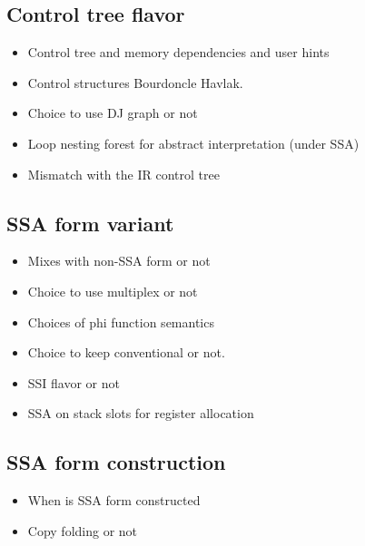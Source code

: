 \subsection{Control tree flavor}

\begin{itemize}

\item Control tree and memory dependencies and user hints

\item Control structures Bourdoncle Havlak.

\item Choice to use DJ graph or not

\item Loop nesting forest for abstract interpretation (under SSA)

\item Mismatch with the IR control tree

\end{itemize}

\subsection{SSA form variant}

\begin{itemize}

\item Mixes with non-SSA form or not

\item Choice to use multiplex or not

\item Choices of phi function semantics

\item Choice to keep conventional or not.

\item SSI flavor or not

\item SSA on stack slots for register allocation

\end{itemize}

\subsection{SSA form construction}

\begin{itemize}

\item When is SSA form constructed

\item Copy folding or not

\end{itemize}

